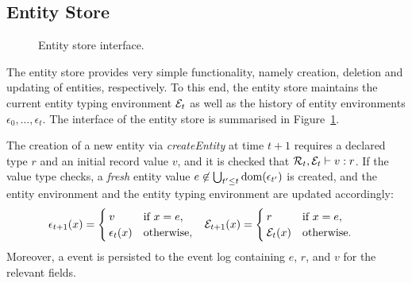 \subsection{Entity Store}
\label{sec:entity-store}

\begin{figure}[t]
  \centering\small
  \newcommand\comp[4][]{%
    \node[box,#1] (#2) {#3\nodepart{two}#4};
  }%
  \caption{Entity store interface.}
  \label{fig:entity-store}
\end{figure}

The entity store provides very simple functionality, namely creation,
deletion and updating of entities, respectively. To this end, the
entity store maintains the current entity typing environment ${\mathcal E}_t$ as
well as the history of entity environments $\epsilon_0, \dots,
\epsilon_t$. The interface of the entity store is summarised in
Figure~\ref{fig:entity-store}.

The creation of a new entity via \emph{createEntity} at time $t+1$
requires a declared type $r$ and an initial record value $v$, and it
is checked that ${\mathcal R}_{t}, {\mathcal E}_{t} \vdash v : r$. If the value
type checks, a \emph{fresh} entity value $e \not\in \bigcup_{t'\le
  t}\operatorname{dom}(\epsilon_{t'})$ is created, and the entity environment and the
entity typing environment are updated accordingly:
\begin{align*}
  \epsilon_{t+1}(x) &=
  \begin{cases}
    v & \mbox{if } x = e,\\
    \epsilon_{t}(x) & \mbox{otherwise},
  \end{cases} &
  {\mathcal E}_{t+1}(x) &=
  \begin{cases}
    r & \mbox{if } x = e,\\
    {\mathcal E}_{t}(x) & \mbox{otherwise}.
  \end{cases}
\end{align*}
Moreover, a  event is persisted to the event log
containing $e$, $r$, and $v$ for the relevant fields.

